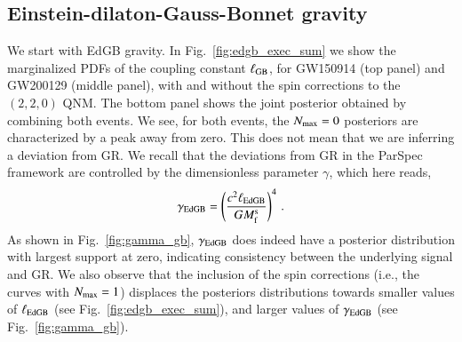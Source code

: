 \documentclass[twocolumn,
               prd,
               aps,
               superscriptaddress,
               tightenlines,
               nofootinbib,
               eqsecnum,
               amsfonts,
               amsmath,
               longbibliography]{revtex4-1}
\newcommand{\hs}[1]{{\textcolor{TealBlue}{{#1}}}}
\begin{document}



\subsection{Einstein-dilaton-Gauss-Bonnet gravity}
\label{sec:results_edgb}


We start with EdGB gravity.
%
In Fig.~\ref{fig:edgb_exec_sum} we show the marginalized PDFs of the
coupling constant $\ell_{\rm GB}$, for GW150914 (top panel) and GW200129
(middle panel), with and without the spin corrections to the $(2,2,0)$ QNM.
%
The bottom panel shows the joint posterior obtained by combining both events.
%
We see, for both events, the $N_{\rm max} = 0$ posteriors are
characterized by a peak away from zero.
%
This does not mean that we are inferring a deviation from GR.
%
We recall that the deviations from GR in the ParSpec framework are controlled
by the dimensionless parameter $\gamma$, which here reads,
%
\begin{equation}
    \gamma_{\rm EdGB} = \left(\frac{c^2 \ell_{\rm EdGB}}{ G M^{\rm s}_{\rm f}}\right)^4\,.
    \label{eq:def_gamma_gb}
\end{equation}
%
As shown in Fig.~\ref{fig:gamma_gb}, $\gamma_{\rm EdGB}$ does indeed have a posterior
distribution with largest support at zero, indicating consistency between
the underlying signal and GR.
%
We also observe that the inclusion of the spin corrections (i.e., the curves with $N_{\rm max} = 1$)
displaces the posteriors distributions towards smaller values of $\ell_{\rm EdGB}$ (see Fig.~\ref{fig:edgb_exec_sum}),
and larger values of $\gamma_{\rm EdGB}$ (see Fig.~\ref{fig:gamma_gb}).
\end{document}
